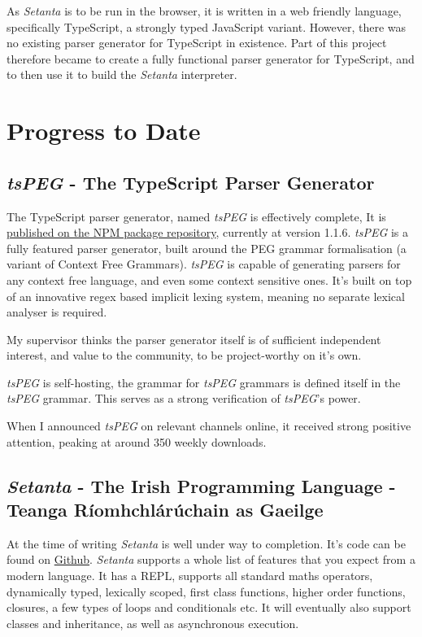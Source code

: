 \documentclass[11pt]{extarticle}
\newcommand{\Setanta}{\emph{Setanta}}
\newcommand{\tsPEG}{\emph{tsPEG}}
\begin{document}
        As \Setanta{} is to be run in the browser, it is written in a web friendly language, specifically TypeScript, a strongly typed JavaScript variant. However, there was no existing parser generator for TypeScript in existence. Part of this project therefore became to create a fully functional parser generator for TypeScript, and to then use it to build the \Setanta{} interpreter.

    \section{Progress to Date}
        \subsection{\tsPEG{} - The TypeScript Parser Generator}

            The TypeScript parser generator, named \tsPEG{} is effectively complete, It is \href{https://www.npmjs.com/package/tspeg}{published on the NPM package repository}, currently at version 1.1.6.  \tsPEG{} is a fully featured parser generator, built around the PEG grammar formalisation (a variant of Context Free Grammars). \tsPEG{} is capable of generating parsers for any context free language, and even some context sensitive ones. It's built on top of an innovative regex based implicit lexing system, meaning no separate lexical analyser is required.

    My supervisor thinks the parser generator itself is of sufficient independent interest, and value to the community, to be project-worthy on it's own.

            \tsPEG{} is self-hosting, the grammar for \tsPEG{} grammars is defined itself in the \tsPEG{} grammar. This serves as a strong verification of \tsPEG{}'s power.

            When I announced \tsPEG{} on relevant channels online, it received strong positive attention, peaking at around 350 weekly downloads.

        \subsection{\Setanta{} - The Irish Programming Language - Teanga R\'iomhchl\'ar\'uchain as Gaeilge}

            At the time of writing \Setanta{} is well under way to completion. It's code can be found on \href{https://github.com/EoinDavey/Setanta}{Github}. \Setanta{} supports a whole list of features that you expect from a modern language. It has a REPL, supports all standard maths operators, dynamically typed, lexically scoped, first class functions, higher order functions, closures, a few types of loops and conditionals etc. It will eventually also support classes and inheritance, as well as asynchronous execution.
\end{document}
